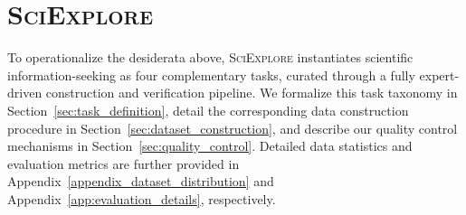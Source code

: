 \section{\textsc{SciExplore}}

To operationalize the desiderata above, \textsc{SciExplore} instantiates scientific information-seeking as four complementary tasks, curated through a fully expert-driven construction and verification pipeline. We formalize this task taxonomy in Section~\ref{sec:task_definition}, detail the corresponding data construction procedure in Section~\ref{sec:dataset_construction}, and describe our quality control mechanisms in Section~\ref{sec:quality_control}. Detailed data statistics and evaluation metrics are further provided in Appendix~\ref{appendix_dataset_distribution} and Appendix~\ref{app:evaluation_details}, respectively.



